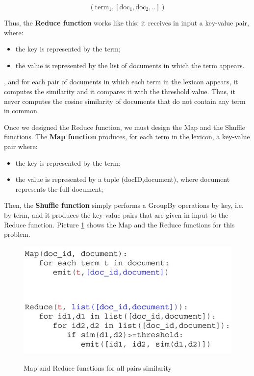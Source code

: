 $$
(\text{term}_1, [\text{doc}_1, \text{doc}_2, ..])
$$

Thus, the \textbf{Reduce function} works like this: it receives in input a key-value pair, where:

\begin{itemize}
    \item the key is represented by the term;
    \item the value is represented by the list of documents in which the term appears.
\end{itemize}

, and for each pair of documents in which each term in the lexicon appears, it computes the similarity and it compares it with the threshold value. Thus, it never computes the cosine similarity of documents that do not contain any term in common. 

Once we designed the Reduce function, we must design the Map and the Shuffle functions. The \textbf{Map function} produces, for each term in the lexicon, a key-value pair where:

\begin{itemize}
    \item the key is represented by the term;
    \item the value is represented by a tuple (docID,document), where document represents the full document;
\end{itemize}

Then, the \textbf{Shuffle function} simply performs a GroupBy operations by key, i.e. by term, and it produces the key-value pairs that are given in input to the Reduce function. Picture \ref{mr all pairs} shows the Map and the Reduce functions for this problem.

\begin{figure}[h!]
		\centering
		\includegraphics[scale = 2.0]{img/map reduce all pairs.jpg}
        \label{mr all pairs}
        \caption{Map and Reduce functions for all pairs similarity}
\end{figure}

